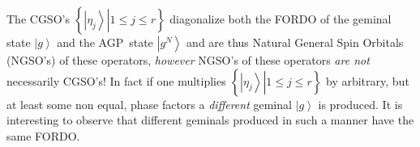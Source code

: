 \documentclass[12pt,aps,amsfonts,amssymb,tightenlines]{revtex4}%
\begin{document}
The CGSO's $\left\{  \left.  \left\vert \eta_{j}\right\rangle \right\vert
1\leq j\leq r\right\}  $ diagonalize both the FORDO of the geminal state
$\left\vert g\right\rangle $ and the AGP\ state $\left\vert g^{N}\right\rangle
$ and are thus Natural General Spin Orbitals (NGSO's) of these operators,
\emph{however }NGSO's of these operators \emph{are not }necessarily CGSO's! In
fact if one multiplies $\left\{  \left.  \left\vert \eta_{j}\right\rangle
\right\vert 1\leq j\leq r\right\}  $ by arbitrary, but at least some non
equal, phase factors a \emph{different }geminal $\left\vert g\right\rangle $
is produced. It is interesting to observe that different geminals produced in
such a manner have the same FORDO.



\end{document}
